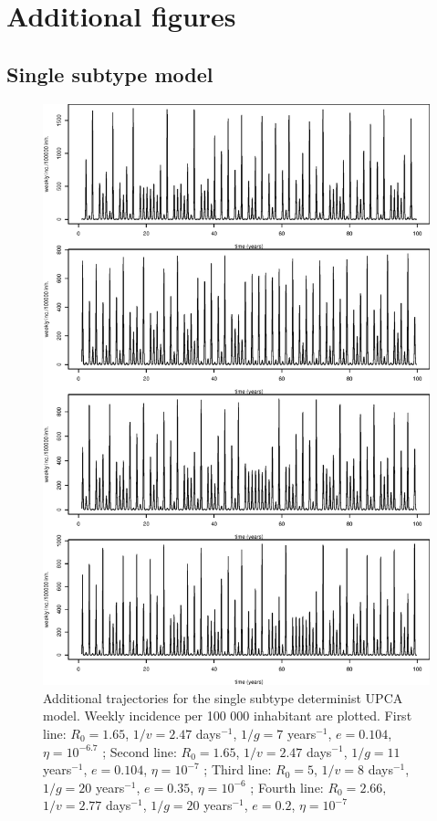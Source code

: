 \documentclass[12pt]{article}
\begin{document}
\section{Additional figures}

\subsection{Single subtype model}

\begin{figure}[htb]
  \center
  \includegraphics[width= 0.8 \linewidth]{graph_annexe/1strain_traj100.eps}
  \caption{Additional trajectories for the single subtype determinist UPCA model. Weekly
    incidence per 100 000 inhabitant are plotted.
    First line: $R_0=1.65$, $1/v=2.47$ days$^{-1}$, $1/g=7$
    years$^{-1}$, $e=0.104$, $\eta=10^{-6.7}$ ;
    Second line: $R_0=1.65$, $1/v=2.47$ days$^{-1}$, $1/g=11$
    years$^{-1}$, $e=0.104$, $\eta=10^{-7}$ ;
    Third line: $R_0=5$, $1/v=8$ days$^{-1}$, $1/g=20$ years$^{-1}$,
    $e=0.35$, $\eta=10^{-6}$ ;
    Fourth line: $R_0=2.66$, $1/v=2.77$ days$^{-1}$, $1/g=20$ years$^{-1}$, $e=0.2$, $\eta=10^{-7}$
  }
\label{fig:1strain_traj100}
\end{figure}
\end{document}
